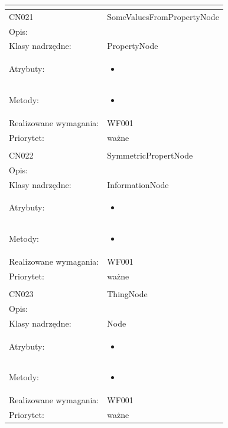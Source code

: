 \documentclass[a4paper,10pt]{article}
\begin{document}
\begin{center}
\begin{longtable}{|m{3cm}|m{9cm}|}
\multicolumn{2}{c}{} \\
 \hline

CN021 & SomeValuesFromPropertyNode \\ \hline
Opis: &     \\ \hline
Klasy nadrzędne: & PropertyNode     \\ \hline
Atrybuty: & \begin{itemize}
 \item 
\end{itemize}
 \\ \hline
Metody: & \begin{itemize}
 \item 
\end{itemize}
  \\ \hline
Realizowane wymagania: & WF001 \\ \hline
Priorytet: & ważne  \\ \hline

\multicolumn{2}{c}{} \\
 \hline

CN022 & SymmetricPropertNode \\ \hline
Opis: &     \\ \hline
Klasy nadrzędne: & InformationNode     \\ \hline
Atrybuty: & \begin{itemize}
 \item 
\end{itemize}
 \\ \hline
Metody: & \begin{itemize}
 \item 
\end{itemize}
  \\ \hline
Realizowane wymagania: & WF001 \\ \hline
Priorytet: & ważne  \\ \hline

\multicolumn{2}{c}{} \\
 \hline

CN023 & ThingNode \\ \hline
Opis: &     \\ \hline
Klasy nadrzędne: & Node     \\ \hline
Atrybuty: & \begin{itemize}
 \item 
\end{itemize}
 \\ \hline
Metody: & \begin{itemize}
 \item 
\end{itemize}
  \\ \hline
Realizowane wymagania: & WF001 \\ \hline
Priorytet: & ważne  \\ \hline


\end{longtable}
\end{center}
\end{document}
